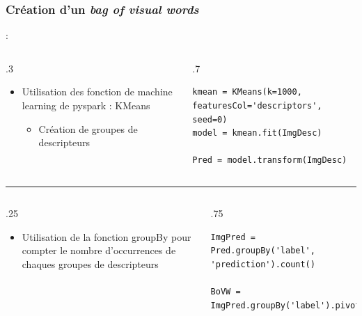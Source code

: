 \documentclass[8pt,aspectratio=169,hyperref={unicode=true}]{beamer}
\begin{document}
\subsubsection{Création d'un \emph{bag of visual words}}
\begin{frame}[fragile]{\insertsubsection : \insertsubsubsection}
  \begin{columns}
    \begin{column}{.3\textwidth}
      \begin{itemize}
        \item Utilisation des fonction de machine learning de pyspark : KMeans
              \begin{itemize}
                \item Création de groupes de descripteurs
              \end{itemize}
      \end{itemize}
    \end{column}
    \begin{column}{.7\textwidth}
      \begin{verbatim}
kmean = KMeans(k=1000, featuresCol='descriptors', seed=0)
model = kmean.fit(ImgDesc)

Pred = model.transform(ImgDesc)
      \end{verbatim}
    \end{column}
  \end{columns}

  \vfill
  \hrule

  \begin{columns}
    \begin{column}{.25\textwidth}
      \begin{itemize}
        \item Utilisation de la fonction groupBy pour compter le nombre d'occurrences de chaques groupes de descripteurs
      \end{itemize}
    \end{column}
    \begin{column}{.75\textwidth}
      \begin{verbatim}
ImgPred = Pred.groupBy('label', 'prediction').count()

BoVW = ImgPred.groupBy('label').pivot('prediction').sum('count').fillna(0)
      \end{verbatim}
    \end{column}
  \end{columns}
\end{frame}
\end{document}
